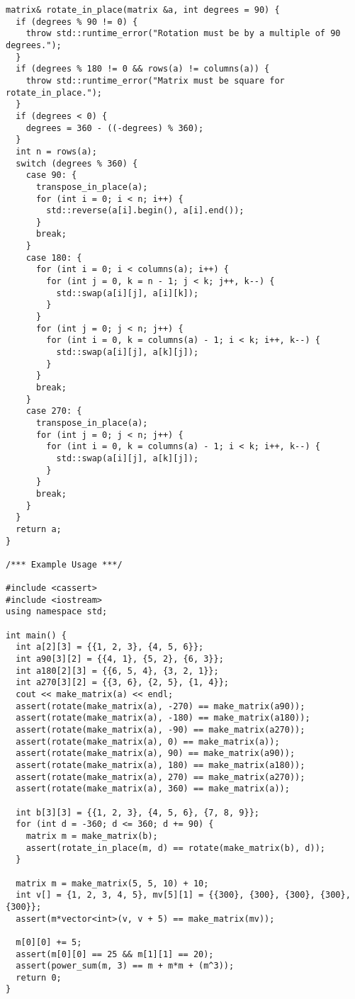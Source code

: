 \begin{lstlisting}
matrix& rotate_in_place(matrix &a, int degrees = 90) {
  if (degrees % 90 != 0) {
    throw std::runtime_error("Rotation must be by a multiple of 90 degrees.");
  }
  if (degrees % 180 != 0 && rows(a) != columns(a)) {
    throw std::runtime_error("Matrix must be square for rotate_in_place.");
  }
  if (degrees < 0) {
    degrees = 360 - ((-degrees) % 360);
  }
  int n = rows(a);
  switch (degrees % 360) {
    case 90: {
      transpose_in_place(a);
      for (int i = 0; i < n; i++) {
        std::reverse(a[i].begin(), a[i].end());
      }
      break;
    }
    case 180: {
      for (int i = 0; i < columns(a); i++) {
        for (int j = 0, k = n - 1; j < k; j++, k--) {
          std::swap(a[i][j], a[i][k]);
        }
      }
      for (int j = 0; j < n; j++) {
        for (int i = 0, k = columns(a) - 1; i < k; i++, k--) {
          std::swap(a[i][j], a[k][j]);
        }
      }
      break;
    }
    case 270: {
      transpose_in_place(a);
      for (int j = 0; j < n; j++) {
        for (int i = 0, k = columns(a) - 1; i < k; i++, k--) {
          std::swap(a[i][j], a[k][j]);
        }
      }
      break;
    }
  }
  return a;
}

/*** Example Usage ***/

#include <cassert>
#include <iostream>
using namespace std;

int main() {
  int a[2][3] = {{1, 2, 3}, {4, 5, 6}};
  int a90[3][2] = {{4, 1}, {5, 2}, {6, 3}};
  int a180[2][3] = {{6, 5, 4}, {3, 2, 1}};
  int a270[3][2] = {{3, 6}, {2, 5}, {1, 4}};
  cout << make_matrix(a) << endl;
  assert(rotate(make_matrix(a), -270) == make_matrix(a90));
  assert(rotate(make_matrix(a), -180) == make_matrix(a180));
  assert(rotate(make_matrix(a), -90) == make_matrix(a270));
  assert(rotate(make_matrix(a), 0) == make_matrix(a));
  assert(rotate(make_matrix(a), 90) == make_matrix(a90));
  assert(rotate(make_matrix(a), 180) == make_matrix(a180));
  assert(rotate(make_matrix(a), 270) == make_matrix(a270));
  assert(rotate(make_matrix(a), 360) == make_matrix(a));

  int b[3][3] = {{1, 2, 3}, {4, 5, 6}, {7, 8, 9}};
  for (int d = -360; d <= 360; d += 90) {
    matrix m = make_matrix(b);
    assert(rotate_in_place(m, d) == rotate(make_matrix(b), d));
  }

  matrix m = make_matrix(5, 5, 10) + 10;
  int v[] = {1, 2, 3, 4, 5}, mv[5][1] = {{300}, {300}, {300}, {300}, {300}};
  assert(m*vector<int>(v, v + 5) == make_matrix(mv));

  m[0][0] += 5;
  assert(m[0][0] == 25 && m[1][1] == 20);
  assert(power_sum(m, 3) == m + m*m + (m^3));
  return 0;
}
\end{lstlisting}
